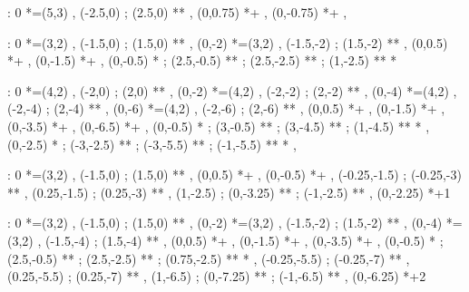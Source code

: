 \documentclass[a4paper,12pt]{article}
\newcommand{\actionsym}[1]{{\mbox{\color{Emerald}{\{$#1$\}}}}}
\begin{document}
\begin{table}[hbtp]

\xy <1cm,0cm>:
0 *=(5,3)\frm{-} ,
(-2.5,0) ; (2.5,0) **\dir{--} ,
\POS (0,0.75) *+{\actionsym{E}} ,
\POS (0,-0.75) *+ ,
\endxy

\end{table}

\begin{table}[hbtp]

\xy <1cm,0cm>:
0 *=(3,2)\frm{-} ,
(-1.5,0) ; (1.5,0) **\dir{--} ,
(0,-2) *=(3,2)\frm{-} ,
(-1.5,-2) ; (1.5,-2) **\dir{--} ,
\POS (0,0.5) *+{\actionsym{E}} ,
\POS (0,-1.5) *+{\actionsym{ANSWER}} ,
(0,-0.5) *{\bullet} ; (2.5,-0.5) **\dir{-} ;
(2.5,-2.5) **\dir{-} ;
(1,-2.5) **\dir{-} *\dir{>}
\endxy

\end{table}

\begin{table}[hbtp]

\xy <1cm,0cm>:
0 *=(4,2)\frm{-} ,
(-2,0) ; (2,0) **\dir{--} ,
(0,-2) *=(4,2)\frm{-} ,
(-2,-2) ; (2,-2) **\dir{--} ,
(0,-4) *=(4,2)\frm{-} ,
(-2,-4) ; (2,-4) **\dir{--} ,
(0,-6) *=(4,2)\frm{-} ,
(-2,-6) ; (2,-6) **\dir{--} ,
\POS (0,0.5) *+{\actionsym{E}} ,
\POS (0,-1.5) *+{\actionsym{E}} ,
\POS (0,-3.5) *+{\txt{\actionsym{ADD} or \actionsym{MULT}}} ,
\POS (0,-6.5) *+ ,
(0,-0.5) *{\bullet} ; (3,-0.5) **\dir{-} ;
(3,-4.5) **\dir{-} ;
(1,-4.5) **\dir{-} *\dir{>} ,
(0,-2.5) *{\bullet} ; (-3,-2.5) **\dir{-} ;
(-3,-5.5) **\dir{-} ;
(-1,-5.5) **\dir{-} *\dir{>} ,
\endxy

\end{table}

\begin{table}[hbtp]

\xy <1cm,0cm>:
0 *=(3,2)\frm{-} ,
(-1.5,0) ; (1.5,0) **\dir{--} ,
\POS (0,0.5) *+{\actionsym{E}} ,
\POS (0,-0.5) *+{\triangledown} ,
(-0.25,-1.5) ; (-0.25,-3) **\dir{-} ,
(0.25,-1.5) ; (0.25,-3) **\dir{-} ,
(1,-2.5) ; (0,-3.25) **\dir{-} ;
(-1,-2.5) **\dir{-} ,
\POS (0,-2.25) *+{1}
\endxy

\vspace{15mm}

\xy <1cm,0cm>:
0 *=(3,2)\frm{-} ,
(-1.5,0) ; (1.5,0) **\dir{--} ,
(0,-2) *=(3,2)\frm{-} ,
(-1.5,-2) ; (1.5,-2) **\dir{--} ,
(0,-4) *=(3,2)\frm{-} ,
(-1.5,-4) ; (1.5,-4) **\dir{--} ,
\POS (0,0.5) *+{\actionsym{E}} ,
\POS (0,-1.5) *+{\actionsym{ANSWER}} ,
\POS (0,-3.5) *+{\triangledown} ,
(0,-0.5) *{\bullet} ; (2.5,-0.5) **\dir{-} ;
(2.5,-2.5) **\dir{-} ;
(0.75,-2.5) **\dir{-} *\dir{>} ,
%
(-0.25,-5.5) ; (-0.25,-7) **\dir{-} ,
(0.25,-5.5) ; (0.25,-7) **\dir{-} ,
(1,-6.5) ; (0,-7.25) **\dir{-} ;
(-1,-6.5) **\dir{-} ,
\POS (0,-6.25) *+{2}
\endxy

\end{table}
\end{document}
